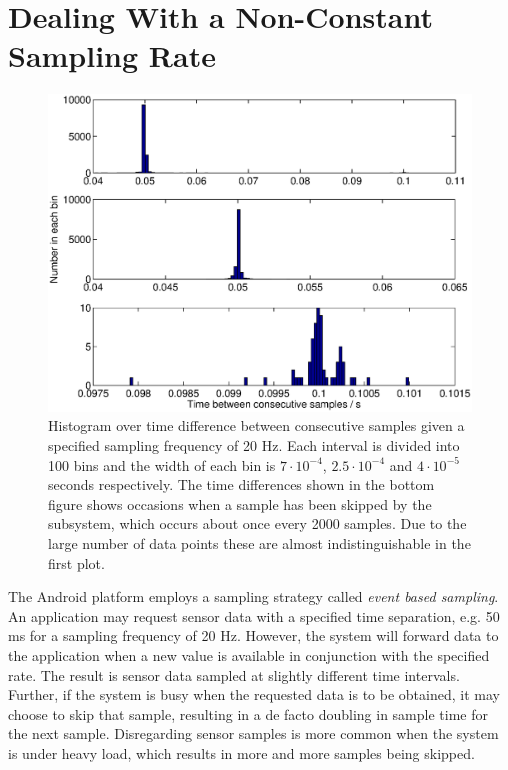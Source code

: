 \documentclass{LTHthesis}
\begin{document}
\section{Dealing With a Non-Constant Sampling Rate}
%
\begin{figure}[!hbt]

\includegraphics[width=1\textwidth ]{images/kinematic/sample_diff}
\caption{Histogram over time difference between consecutive samples given a specified sampling frequency of 20 Hz. Each interval is divided into 100 bins and the width of each bin is $7\cdot10^{-4}$, $2.5\cdot10^{-4}$ and $4\cdot10^{-5}$ seconds respectively. The time differences shown in the bottom figure shows occasions when a sample has been skipped by the subsystem, which occurs about once every 2000 samples. Due to the large number of data points these are almost indistinguishable in the first plot.}\label{sample_diff}
\end{figure}
%
The Android platform employs a sampling strategy called \emph{event based sampling}. An application may request sensor data with a specified time separation, e.g. 50 ms for a sampling frequency of 20 Hz. However, the system will forward data to the application when a new value is available in conjunction with the specified rate. The result is sensor data sampled at slightly different time intervals. Further, if the system is busy when the requested data is to be obtained, it may choose to skip that sample, resulting in a de facto doubling in sample time for the next sample. Disregarding sensor samples is more common when the system is under heavy load, which results in more and more samples being skipped.
\end{document}

